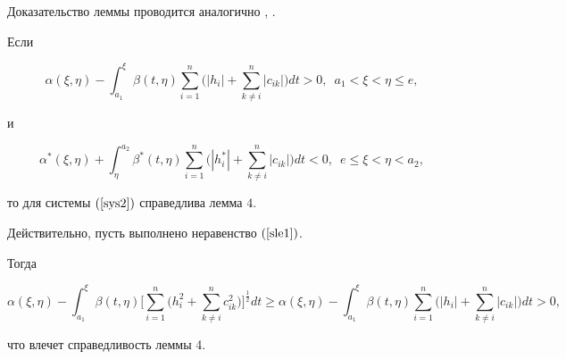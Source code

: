 Доказательство леммы проводится аналогично \cite{SabDAN}, \cite{SaId}.





\begin{cor}


Если


\begin{equation}\label{sle1}


\alpha (\xi,\eta)-\int_{a_1}^{\xi }\beta(t,\eta)


\sum_{i=1}^n\bigg(|h_i|+\sum_{k\ne i}^n |c_{ik}|\bigg)dt>0,\ \;


a_1<\xi <\eta \le e,


\end{equation}


и


$$




\alpha^* (\xi,\eta)+\int_{\eta}^{a_2}\beta^*(t,\eta)


\sum_{i=1}^n\bigg(|h_i^*|+\sum_{k\ne i}^n |c_{ik}|\bigg)dt<0,\ \;


e\le\xi <\eta < a_2,




$$


то для системы $(\ref{sys2})$ справедлива лемма $4$.


\end{cor}





Действительно, пусть выполнено неравенство $(\ref{sle1})$.


Тогда


$$


\alpha (\xi,\eta)-\int_{a_1}^\xi \beta (t,\eta)\bigg


[\sum_{i=1}^n\bigg (h_i^2+\sum_{k\ne


i}^n c_{ik}^2\bigg)\bigg]^{\frac{1}{2}}dt\ge 


\alpha (\xi,\eta)-\int_{a_1}^\xi \beta (t,\eta


)\sum_{i=1}^n\bigg (|h_i|+\sum_{k\ne


i}^n|c_{ik}|\bigg)dt>0,


$$


что влечет справедливость леммы 4.





